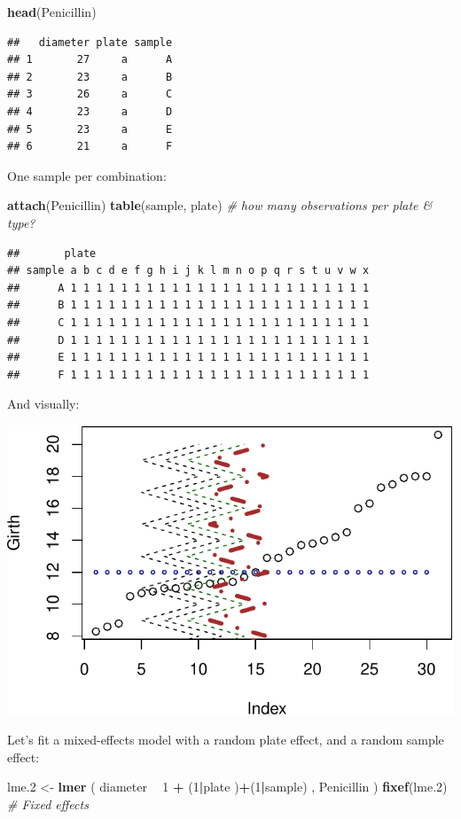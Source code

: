\documentclass[]{book}
\newenvironment{Shaded}{\begin{snugshade}}{\end{snugshade}}
\newcommand{\CommentTok}[1]{\textcolor[rgb]{0.56,0.35,0.01}{\textit{#1}}}
\newcommand{\DecValTok}[1]{\textcolor[rgb]{0.00,0.00,0.81}{#1}}
\newcommand{\FloatTok}[1]{\textcolor[rgb]{0.00,0.00,0.81}{#1}}
\newcommand{\KeywordTok}[1]{\textcolor[rgb]{0.13,0.29,0.53}{\textbf{#1}}}
\newcommand{\NormalTok}[1]{#1}
\newcommand{\OperatorTok}[1]{\textcolor[rgb]{0.81,0.36,0.00}{\textbf{#1}}}
\newcommand{\StringTok}[1]{\textcolor[rgb]{0.31,0.60,0.02}{#1}}
\theoremstyle{definition}
\theoremstyle{definition}
\theoremstyle{definition}
\theoremstyle{remark}
\begin{document}
\begin{Shaded}
\begin{Highlighting}[]
\KeywordTok{head}\NormalTok{(Penicillin)}
\end{Highlighting}
\end{Shaded}

\begin{verbatim}
##   diameter plate sample
## 1       27     a      A
## 2       23     a      B
## 3       26     a      C
## 4       23     a      D
## 5       23     a      E
## 6       21     a      F
\end{verbatim}

One sample per combination:

\begin{Shaded}
\begin{Highlighting}[]
\KeywordTok{attach}\NormalTok{(Penicillin)}
\KeywordTok{table}\NormalTok{(sample, plate) }\CommentTok{# how many observations per plate & type?}
\end{Highlighting}
\end{Shaded}

\begin{verbatim}
##       plate
## sample a b c d e f g h i j k l m n o p q r s t u v w x
##      A 1 1 1 1 1 1 1 1 1 1 1 1 1 1 1 1 1 1 1 1 1 1 1 1
##      B 1 1 1 1 1 1 1 1 1 1 1 1 1 1 1 1 1 1 1 1 1 1 1 1
##      C 1 1 1 1 1 1 1 1 1 1 1 1 1 1 1 1 1 1 1 1 1 1 1 1
##      D 1 1 1 1 1 1 1 1 1 1 1 1 1 1 1 1 1 1 1 1 1 1 1 1
##      E 1 1 1 1 1 1 1 1 1 1 1 1 1 1 1 1 1 1 1 1 1 1 1 1
##      F 1 1 1 1 1 1 1 1 1 1 1 1 1 1 1 1 1 1 1 1 1 1 1 1
\end{verbatim}

And visually:

\includegraphics[width=0.5\linewidth]{Rcourse_files/figure-latex/unnamed-chunk-203-1}

Let's fit a mixed-effects model with a random plate effect, and a random sample effect:

\begin{Shaded}
\begin{Highlighting}[]
\NormalTok{lme}\FloatTok{.2}\NormalTok{ <-}\StringTok{ }\KeywordTok{lmer}\NormalTok{ ( diameter }\OperatorTok{~}\StringTok{  }\DecValTok{1}  \OperatorTok{+}\StringTok{ }\NormalTok{(}\DecValTok{1}\OperatorTok{|}\NormalTok{plate )}\OperatorTok{+}\NormalTok{(}\DecValTok{1}\OperatorTok{|}\NormalTok{sample) , Penicillin )}
\KeywordTok{fixef}\NormalTok{(lme}\FloatTok{.2}\NormalTok{) }\CommentTok{# Fixed effects}
\end{Highlighting}
\end{Shaded}
\end{document}

